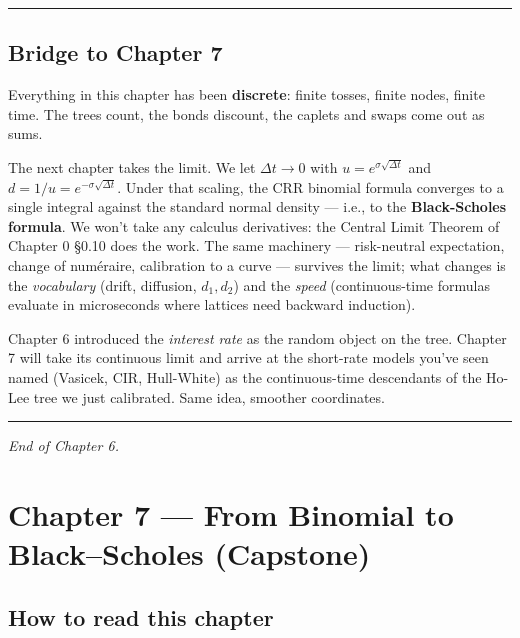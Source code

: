 \documentclass[
  10pt,
  twoside]{book}
\begin{document}
\begin{center}\rule{0.5\linewidth}{0.5pt}\end{center}

\section{Bridge to Chapter 7}\label{bridge-to-chapter-7}

Everything in this chapter has been \textbf{discrete}: finite tosses,
finite nodes, finite time. The trees count, the bonds discount, the
caplets and swaps come out as sums.

The next chapter takes the limit. We let \(\Delta t \to 0\) with
\(u = e^{\sigma\sqrt{\Delta t}}\) and
\(d = 1/u = e^{-\sigma\sqrt{\Delta t}}\). Under that scaling, the CRR
binomial formula converges to a single integral against the standard
normal density --- i.e., to the \textbf{Black-Scholes formula}. We won't
take any calculus derivatives: the Central Limit Theorem of Chapter 0
§0.10 does the work. The same machinery --- risk-neutral expectation,
change of numéraire, calibration to a curve --- survives the limit; what
changes is the \emph{vocabulary} (drift, diffusion, \(d_1, d_2\)) and
the \emph{speed} (continuous-time formulas evaluate in microseconds
where lattices need backward induction).

Chapter 6 introduced the \emph{interest rate} as the random object on
the tree. Chapter 7 will take its continuous limit and arrive at the
short-rate models you've seen named (Vasicek, CIR, Hull-White) as the
continuous-time descendants of the Ho-Lee tree we just calibrated. Same
idea, smoother coordinates.

\begin{center}\rule{0.5\linewidth}{0.5pt}\end{center}

\emph{End of Chapter 6.}

\newpage

\chapter{Chapter 7 --- From Binomial to Black--Scholes
(Capstone)}\label{chapter-7-from-binomial-to-blackscholes-capstone}

\section{How to read this chapter}\label{how-to-read-this-chapter-5}
\end{document}
